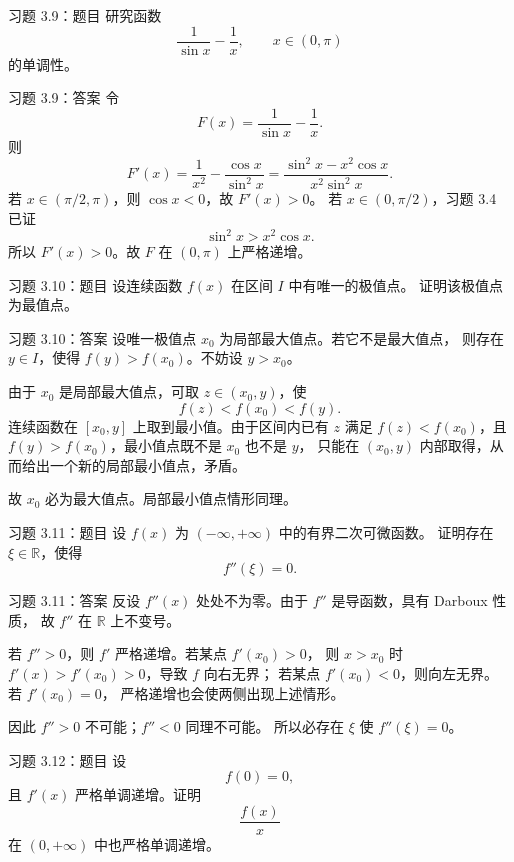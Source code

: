 \documentclass[aspectratio=169,10pt]{ctexbeamer}
\newcommand{\R}{\mathbb{R}}
\begin{document}
\begin{frame}{习题 3.9：题目}
\small
研究函数
\[
  \frac1{\sin x}-\frac1x,\qquad x\in(0,\pi)
\]
的单调性。
\end{frame}

\begin{frame}{习题 3.9：答案}
\small
令
\[
  F(x)=\frac1{\sin x}-\frac1x.
\]
则
\[
  F'(x)=\frac1{x^2}-\frac{\cos x}{\sin^2x}
       =\frac{\sin^2x-x^2\cos x}{x^2\sin^2x}.
\]
若 $x\in(\pi/2,\pi)$，则 $\cos x<0$，故 $F'(x)>0$。
若 $x\in(0,\pi/2)$，习题 3.4 已证
\[
  \sin^2x>x^2\cos x.
\]
所以 $F'(x)>0$。故 $F$ 在 $(0,\pi)$ 上严格递增。
\end{frame}

\begin{frame}{习题 3.10：题目}
\small
设连续函数 $f(x)$ 在区间 $I$ 中有唯一的极值点。
证明该极值点为最值点。
\end{frame}

\begin{frame}{习题 3.10：答案}
\small
设唯一极值点 $x_0$ 为局部最大值点。若它不是最大值点，
则存在 $y\in I$，使得 $f(y)>f(x_0)$。不妨设 $y>x_0$。

由于 $x_0$ 是局部最大值点，可取 $z\in(x_0,y)$，使
\[
  f(z)<f(x_0)<f(y).
\]
连续函数在 $[x_0,y]$ 上取到最小值。由于区间内已有 $z$ 满足
$f(z)<f(x_0)$，且 $f(y)>f(x_0)$，最小值点既不是 $x_0$ 也不是 $y$，
只能在 $(x_0,y)$ 内部取得，从而给出一个新的局部最小值点，矛盾。

故 $x_0$ 必为最大值点。局部最小值点情形同理。
\end{frame}

\begin{frame}{习题 3.11：题目}
\small
设 $f(x)$ 为 $(-\infty,+\infty)$ 中的有界二次可微函数。
证明存在 $\xi\in\R$，使得
\[
  f''(\xi)=0.
\]
\end{frame}

\begin{frame}{习题 3.11：答案}
\small
反设 $f''(x)$ 处处不为零。由于 $f''$ 是导函数，具有 Darboux 性质，
故 $f''$ 在 $\R$ 上不变号。

若 $f''>0$，则 $f'$ 严格递增。若某点 $f'(x_0)>0$，
则 $x>x_0$ 时 $f'(x)>f'(x_0)>0$，导致 $f$ 向右无界；
若某点 $f'(x_0)<0$，则向左无界。若 $f'(x_0)=0$，
严格递增也会使两侧出现上述情形。

因此 $f''>0$ 不可能；$f''<0$ 同理不可能。
所以必存在 $\xi$ 使 $f''(\xi)=0$。
\end{frame}

\begin{frame}{习题 3.12：题目}
\small
设
\[
  f(0)=0,
\]
且 $f'(x)$ 严格单调递增。证明
\[
  \frac{f(x)}x
\]
在 $(0,+\infty)$ 中也严格单调递增。
\end{frame}
\end{document}
